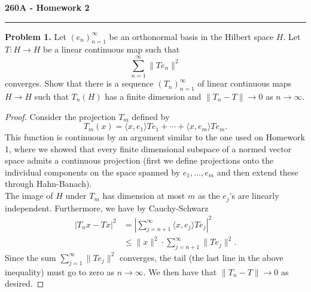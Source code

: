 \documentclass[11pt,letterpaper]{report}
\begin{document}
\begin{center}
{\bf \Large 260A - Homework 2} %
\vspace{0.2cm}
\hrule
\end{center}

\noindent\textbf{Problem 1. }
Let $(e_n)_{n=1}^\infty$ be an orthonormal basis in the Hilbert space $H$. Let $T: H\to H$ be a linear continuous map such that
\[
\sum_{n=1}^\infty \|Te_n\|^2
\]
converges. Show that there is a sequence $(T_n)_{n=1}^\infty$ of linear continuous maps $H\to H$ such that $T_n(H)$ has a finite dimension and $\|T_n-T\|\to 0$ as $n\to \infty$.
\begin{proof}
	Consider the projection $T_m$ defined by
	\[
	T_m(x) = \langle x, e_1\rangle Te_1 + \cdots +\langle x, e_m\rangle Te_m.
	\]
	This function is continuous by an argument similar to the one used on Homework 1, where we showed that every finite dimensional subspace of a normed vector space admits a continuous projection (first we define projections onto the individual components on the space spanned by $e_1, \ldots, e_m$ and then extend these through Hahn-Banach).\\

	\noindent The image of $H$ under $T_m$ has dimension at most $m$ as the $e_j$'s are linearly independent. Furthermore, we have by Cauchy-Schwarz
	\begin{align*}
	|T_nx - Tx|^2 &= \left|\sum_{j = n+1}^\infty \langle x, e_j\rangle Te_j\right|^2\\
	&\leq \|x\|^2\cdot \sum_{j=n+1}^\infty \|Te_j\|^2.
	\end{align*}
	Since the sum $\sum_{j=1}^\infty\|Te_j\|^2$ converges, the tail (the last line in the above inequality) must go to zero as $n\to \infty$. We then have that $\|T_n-T\|\to 0$ as desired.
\end{proof}
\end{document}

